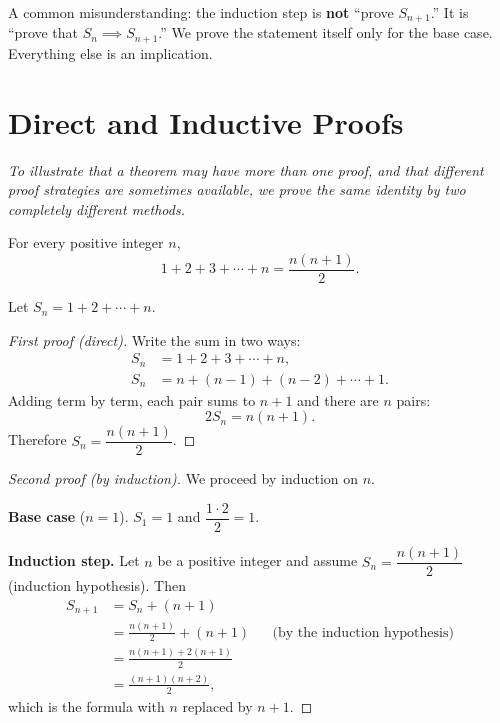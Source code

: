 \begin{remark}[Warning]
A common misunderstanding: the induction step is \textbf{not} ``prove $S_{n+1}$.''  It is ``prove that $S_{n} \implies S_{n+1}$.''  We prove the statement itself only for the base case.  Everything else is an implication.
\end{remark}

\section{Direct and Inductive Proofs}
\label{sec:1.15}

\textit{To illustrate that a theorem may have more than one proof, and that different proof strategies are sometimes available, we prove the same identity by two completely different methods.}

\begin{theorem}
\label{thm:1-13}
For every positive integer $n$,
\[
  1 + 2 + 3 + \cdots + n = \frac{n(n+1)}{2}.
\]
\end{theorem}

Let $S_{n} = 1 + 2 + \cdots + n$.

\begin{proof}[First proof (direct)]
Write the sum in two ways:
\begin{align*}
  S_{n} &= 1 + 2 + 3 + \cdots + n, \\
  S_{n} &= n + (n-1) + (n-2) + \cdots + 1.
\end{align*}
Adding term by term, each pair sums to $n + 1$ and there are $n$ pairs:
\[
  2S_{n} = n(n+1).
\]
Therefore $S_{n} = \dfrac{n(n+1)}{2}$.
\end{proof}

\begin{proof}[Second proof (by induction)]
We proceed by induction on $n$.

\textbf{Base case} ($n = 1$).  $S_{1} = 1$ and $\dfrac{1 \cdot 2}{2} = 1$.  \checkmark

\textbf{Induction step.}  Let $n$ be a positive integer and assume $S_{n} = \dfrac{n(n+1)}{2}$ (induction hypothesis).  Then
\begin{align*}
  S_{n+1} &= S_{n} + (n+1) \\
           &= \frac{n(n+1)}{2} + (n+1) &&\text{(by the induction hypothesis)} \\
           &= \frac{n(n+1) + 2(n+1)}{2} \\
           &= \frac{(n+1)(n+2)}{2},
\end{align*}
which is the formula with $n$ replaced by $n+1$.
\end{proof}


